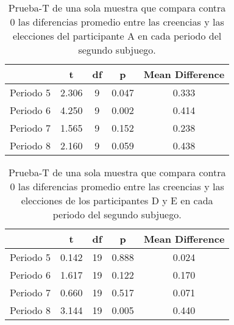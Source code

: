 \begin{table}
\caption[Diferencias Normalizadas en el Subjuego 2 omitiendo la multiplicación $\cdot p$, Participante A]{Prueba-T de una sola muestra que compara contra 0 las diferencias promedio entre las creencias y las elecciones del participante A en cada periodo del segundo subjuego.}
\label{DN_Sub1}
\centering
\begin{tabular}{l | c c c c}  %
\toprule
\textbf{} & \textbf{t} & \textbf{df} & \textbf{p} & \textbf{Mean Difference}\\
\midrule
Periodo 5 & 2.306 & 9 & 0.047 & 0.333 \\
Periodo 6 & 4.250 & 9 & 0.002 & 0.414 \\
Periodo 7 & 1.565 & 9 & 0.152 & 0.238 \\
Periodo 8 & 2.160 & 9 & 0.059 & 0.438 \\
\bottomrule
\end{tabular}
\end{table}

\begin{table}
\caption[Diferencias Normalizadas en el Subjuego 2 omitiendo la multiplicación $\cdot p$, Participantes D y E]{Prueba-T de una sola muestra que compara contra 0 las diferencias promedio entre las creencias y las elecciones de los participantes D y E en cada periodo del segundo subjuego.}
\label{DN_Sub1}
\centering
\begin{tabular}{l | c c c c}  %
\toprule
\textbf{} & \textbf{t} & \textbf{df} & \textbf{p} & \textbf{Mean Difference}\\
\midrule
Periodo 5 & 0.142 & 19 & 0.888 & 0.024 \\
Periodo 6 & 1.617 & 19 & 0.122 & 0.170 \\
Periodo 7 & 0.660 & 19 & 0.517 & 0.071 \\
Periodo 8 & 3.144 & 19 & 0.005 & 0.440 \\
\bottomrule
\end{tabular}
\end{table}

